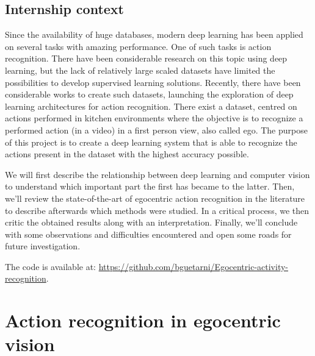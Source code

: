 \documentclass[12pt, a4paper]{report}
\begin{document}
		\section{Internship context}
			Since the availability of huge databases, modern deep learning has been applied on several tasks with amazing performance.
			One of such tasks is action recognition.
			There have been considerable research on this topic using deep learning, but the lack of relatively large scaled datasets have limited the possibilities to develop supervised learning solutions.
			Recently, there have been considerable works to create such datasets, launching the exploration of deep learning architectures for action recognition.
			There exist a dataset, centred on actions performed in kitchen environments where the objective is to recognize a performed action (in a video) in a first person view, also called \gls{ego}.
			The purpose of this project is to create a deep learning system that is able to recognize the actions present in the dataset with the highest accuracy possible.
			\par
			\bigbreak
			We will first describe the relationship between deep learning and computer vision to understand which important part the first has became to the latter.
			Then, we'll review the state-of-the-art of egocentric action recognition in the literature to describe afterwards which methods were studied.
			In a critical process, we then critic the obtained results along with an interpretation.
			Finally, we'll conclude with some observations and difficulties encountered and open some roads for future investigation.
			\par
			\bigbreak
			The code is available at: \url{https://github.com/bguetarni/Egocentric-activity-recognition}.
	\chapter{Action recognition in egocentric vision}
\end{document}
